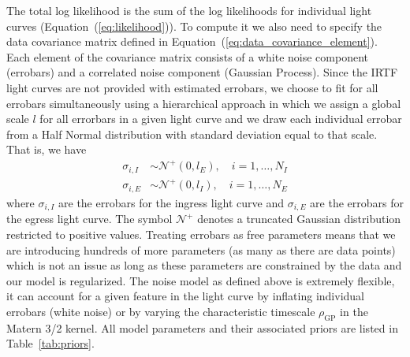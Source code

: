 \documentclass[modern]{aastex62}
\begin{document}
The total log likelihood is the sum of the log likelihoods for individual light curves (Equation~(\ref{eq:likelihood})). 
To compute it we also need to specify the data covariance matrix defined in Equation~(\ref{eq:data_covariance_element}).
Each element of the covariance matrix consists of a white noise component (errobars) and a correlated noise component (Gaussian Process).
Since the IRTF light curves are not provided with estimated errobars, we choose to fit for all errobars simultaneously using a hierarchical approach in which we assign a global scale $l$ for all errorbars in a given light curve and we draw each individual errobar from a Half Normal distribution with standard deviation equal to that scale.
That is, we have 
\begin{align}
    \sigma_{i,I}&\sim \mathcal{N}^+(0, l_E),\quad i=1,\dots,N_I\\
    \sigma_{i,E}&\sim \mathcal{N}^+(0,l_I),\quad i=1,\dots, N_E
\end{align}
where $\sigma_{i,I}$ are the errobars for the ingress light curve and $\sigma_{i,E}$ are the errobars for the egress light curve.
The symbol $\mathcal{N}^+$ denotes a truncated Gaussian distribution restricted to positive values.
Treating errobars as free parameters means that we are introducing hundreds of more parameters (as many as there are data points) which is not an issue as long as these parameters are constrained by the data and our model is regularized.
The noise model as defined above is extremely flexible, it can account for a given feature in the light curve by inflating individual errobars (white noise) or by varying the characteristic timescale $\rho_\mathrm{GP}$ in the Matern 3/2 kernel.
All model parameters and their associated priors are listed in Table~\ref{tab:priors}. 
\end{document}
